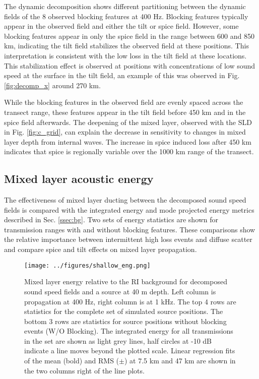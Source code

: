 \documentclass[preprint,NumberedRefs]{JASA}
\begin{document}
The dynamic decomposition shows different partitioning between the dynamic fields of the 8 observed blocking features at 400 Hz. Blocking features typically appear in the observed field and either the tilt or spice field. However, some blocking features appear in only the spice field in the range between 600 and 850 km, indicating the tilt field stabilizes the observed field at these positions. This interpretation is consistent with the low loss in the tilt field at these locations. This stabilization effect is observed at positions with concentrations of low sound speed at the surface in the tilt field, an example of this was observed in Fig. \ref{fig:decomp_x} around 270 km.

While the blocking features in the observed field are evenly spaced across the transect range, these features appear in the tilt field before 450 km and in the spice field afterwards. The deepening of the mixed layer, observed with the SLD in Fig. \ref{fig:c_grid}, can explain the decrease in sensitivity to changes in mixed layer depth from internal waves. The increase in spice induced loss after 450 km indicates that spice is regionally variable over the 1000 km range of the transect.

\subsection{Mixed layer acoustic energy}\label{ssec:energy}
The effectiveness of mixed layer ducting between the decomposed sound speed fields is compared with the integrated energy and mode projected energy metrics described in Sec. \ref{ssec:bg}. Two sets of energy statistics are shown for transmission ranges with and without blocking features. These comparisons show the relative importance between intermittent high loss events and diffuse scatter and compare spice and tilt effects on mixed layer propagation.

\begin{figure}
\texttt{[image: ../figures/shallow\_eng.png]}
    \caption{Mixed layer energy relative to the RI background for decomposed sound speed fields and a source at 40 m depth. Left column is propagation at 400 Hz, right column is at 1 kHz. The top 4 rows are statistics for the complete set of simulated source positions. The bottom 3 rows are statistics for source positions without blocking events (W/O Blocking). The integrated energy for all transmissions in the set are shown as light grey lines, half circles at -10 dB indicate a line moves beyond the plotted scale. Linear regression fits of the mean (bold) and RMS ($\pm$) at 7.5 km and 47 km are shown in the two columns right of the line plots.}
    \label{fig:shal_eng}
\end{figure}
\end{document}
